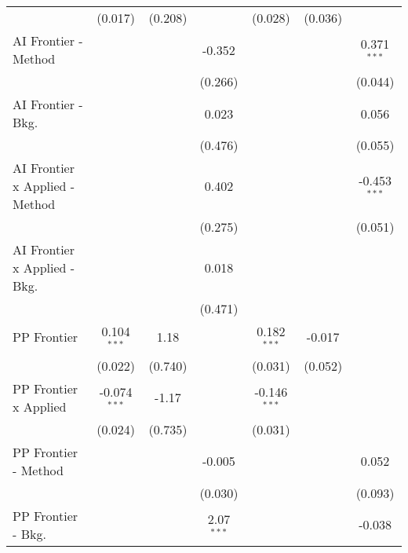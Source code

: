 \begin{tabular}{lcccccc}
                                  & (0.017)        & (0.208)        &                & (0.028)        & (0.036)        &   \\   
   AI Frontier - Method           &                &                & -0.352         &                &                & 0.371$^{***}$\\   
                                  &                &                & (0.266)        &                &                & (0.044)\\   
   AI Frontier - Bkg.             &                &                & 0.023          &                &                & 0.056\\   
                                  &                &                & (0.476)        &                &                & (0.055)\\   
   AI Frontier x Applied - Method &                &                & 0.402          &                &                & -0.453$^{***}$\\   
                                  &                &                & (0.275)        &                &                & (0.051)\\   
   AI Frontier x Applied - Bkg.   &                &                & 0.018          &                &                &   \\   
                                  &                &                & (0.471)        &                &                &   \\   
   PP Frontier                    & 0.104$^{***}$  & 1.18           &                & 0.182$^{***}$  & -0.017         &   \\   
                                  & (0.022)        & (0.740)        &                & (0.031)        & (0.052)        &   \\   
   PP Frontier x Applied          & -0.074$^{***}$ & -1.17          &                & -0.146$^{***}$ &                &   \\   
                                  & (0.024)        & (0.735)        &                & (0.031)        &                &   \\   
   PP Frontier - Method           &                &                & -0.005         &                &                & 0.052\\   
                                  &                &                & (0.030)        &                &                & (0.093)\\   
   PP Frontier - Bkg.             &                &                & 2.07$^{***}$   &                &                & -0.038\\   

\end{tabular}
